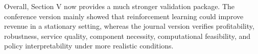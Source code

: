 \documentclass[11pt, a4paper]{article}
\begin{document}
\begin{itemize}
\begin{boxedminipage}[htbp]{\linewidth}
        \label{fig:reply_heatmaps}
    \end{boxedminipage}

\noindent Overall, Section V now provides a much stronger validation package. The conference version mainly showed that reinforcement learning could improve revenue in a stationary setting, whereas the journal version verifies profitability, robustness, service quality, component necessity, computational feasibility, and policy interpretability under more realistic conditions.


\end{itemize}

\newpage




\end{document}
